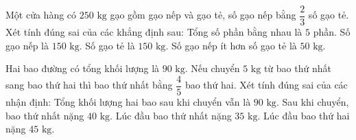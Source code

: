 \begin{ex} %
Một cửa hàng có $250\text{ kg}$ gạo gồm gạo nếp và gạo tẻ, số gạo nếp bằng $\dfrac{2}{3}$ số gạo tẻ. Xét tính đúng sai của các khẳng định sau:
\choiceTF
{\True Tổng số phần bằng nhau là $5$ phần.}
{Số gạo nếp là $150\text{ kg}$.}
{\True Số gạo tẻ là $150\text{ kg}$.}
{\True Số gạo nếp ít hơn số gạo tẻ là $50\text{ kg}$.}
\end{ex}

\begin{ex} %
Hai bao đường có tổng khối lượng là $90\text{ kg}$. Nếu chuyển $5\text{ kg}$ từ bao thứ nhất sang bao thứ hai thì bao thứ nhất bằng $\dfrac{4}{5}$ bao thứ hai. Xét tính đúng sai của các nhận định:
\choiceTF
{\True Tổng khối lượng hai bao sau khi chuyển vẫn là $90\text{ kg}$.}
{\True Sau khi chuyển, bao thứ nhất nặng $40\text{ kg}$.}
{Lúc đầu bao thứ nhất nặng $35\text{ kg}$.}
{\True Lúc đầu bao thứ hai nặng $45\text{ kg}$.}
\end{ex}

